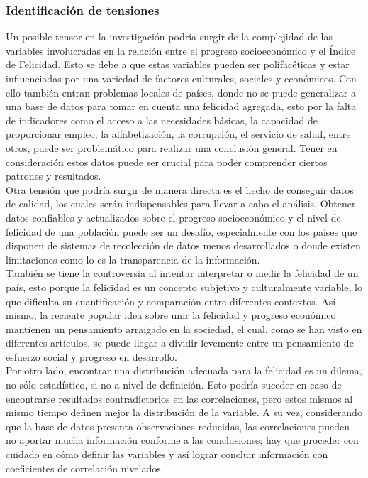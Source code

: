\newpage
\subsubsection{Identificación de tensiones}

Un posible tensor en la investigación podría surgir de la complejidad de las variables involucradas en la relación entre el progreso socioeconómico y el Índice de Felicidad. Esto se debe a que estas variables pueden ser polifacéticas y estar influenciadas por una variedad de factores culturales, sociales y económicos. Con ello también entran problemas locales de países, donde no se puede generalizar a una base de datos para tomar en cuenta una felicidad agregada, esto por la falta de indicadores como el acceso a las necesidades básicas, la capacidad de proporcionar empleo, la alfabetización, la corrupción, el servicio de salud, entre otros, puede ser problemático para realizar una conclusión general. Tener en consideración estos datos puede ser crucial para poder comprender ciertos patrones y resultados.\\

Otra tensión que podría surgir de manera directa es el hecho de conseguir datos de calidad, los cuales serán indispensables para llevar a cabo el análisis. Obtener datos confiables y actualizados sobre el progreso socioeconómico y el nivel de felicidad de una población puede ser un desafío, especialmente con los países que disponen de sistemas de recolección de datos menos desarrollados o donde existen limitaciones como lo es la transparencia de la información.\\

También se tiene la controversia al intentar interpretar o medir la felicidad de un país, esto porque la felicidad es un concepto subjetivo y culturalmente variable, lo que dificulta su cuantificación y comparación entre diferentes contextos. Así mismo, la reciente popular idea sobre unir la felicidad y progreso económico mantienen un pensamiento arraigado en la sociedad, el cual, como se han visto en diferentes artículos, se puede llegar a dividir levemente entre un pensamiento de esfuerzo social y progreso en desarrollo.\\

Por otro lado, encontrar una distribución adecuada para la felicidad es un dilema, no sólo estadístico, si no a nivel de definición. Esto podría suceder en caso de encontrarse resultados contradictorios en las correlaciones, pero estos mismos al mismo tiempo definen mejor la distribución de la variable. A su vez, considerando que la base de datos presenta observaciones reducidas, las correlaciones pueden no aportar mucha información conforme a las conclusiones; hay que proceder con cuidado en cómo definir las variables y así lograr concluir información con coeficientes de correlación nivelados. \\  

